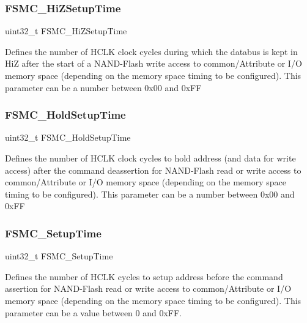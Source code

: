 \subsubsection{\texorpdfstring{FSMC\_HiZSetupTime}{FSMC\_HiZSetupTime}}
{\footnotesize\ttfamily uint32\+\_\+t F\+S\+M\+C\+\_\+\+Hi\+Z\+Setup\+Time}

Defines the number of H\+C\+LK clock cycles during which the databus is kept in HiZ after the start of a N\+A\+N\+D-\/\+Flash write access to common/\+Attribute or I/O memory space (depending on the memory space timing to be configured). This parameter can be a number between 0x00 and 0x\+FF \mbox{\label{struct_f_s_m_c___n_a_n_d___p_c_c_a_r_d_timing_init_type_def_a9830626a2ab6b45fa384adbc5c55eb69}} 
\subsubsection{\texorpdfstring{FSMC\_HoldSetupTime}{FSMC\_HoldSetupTime}}
{\footnotesize\ttfamily uint32\+\_\+t F\+S\+M\+C\+\_\+\+Hold\+Setup\+Time}

Defines the number of H\+C\+LK clock cycles to hold address (and data for write access) after the command deassertion for N\+A\+N\+D-\/\+Flash read or write access to common/\+Attribute or I/O memory space (depending on the memory space timing to be configured). This parameter can be a number between 0x00 and 0x\+FF \mbox{\label{struct_f_s_m_c___n_a_n_d___p_c_c_a_r_d_timing_init_type_def_a3b0b076d6c5cae5a023aba6d74ffb1b7}} 
\subsubsection{\texorpdfstring{FSMC\_SetupTime}{FSMC\_SetupTime}}
{\footnotesize\ttfamily uint32\+\_\+t F\+S\+M\+C\+\_\+\+Setup\+Time}

Defines the number of H\+C\+LK cycles to setup address before the command assertion for N\+A\+N\+D-\/\+Flash read or write access to common/\+Attribute or I/O memory space (depending on the memory space timing to be configured). This parameter can be a value between 0 and 0x\+FF. \mbox{\label{struct_f_s_m_c___n_a_n_d___p_c_c_a_r_d_timing_init_type_def_abf4f8b523317ce9a2e079c2b5ac1d857}} 
